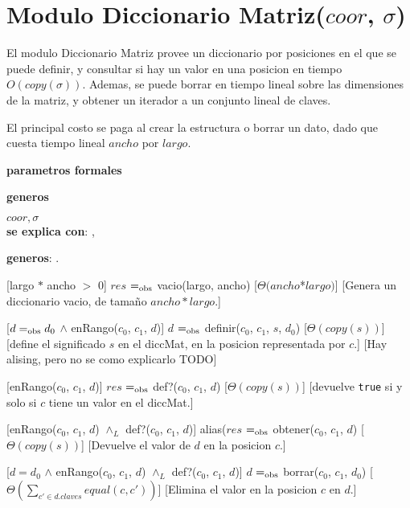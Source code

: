 \section{Modulo Diccionario Matriz($coor$, $\sigma$)}

El modulo Diccionario Matriz provee un diccionario por posiciones en el que se puede definir, y consultar si hay un valor en una posicion en tiempo $O(copy(\sigma))$. Ademas, se puede borrar en tiempo lineal sobre las dimensiones de la matriz, y obtener un iterador a un conjunto lineal de claves.

El principal costo se paga al crear la estructura o borrar un dato, dado que cuesta tiempo lineal $ancho$ por $largo$.

\begin{Interfaz}

  \textbf{parametros formales}\parindent\\
  \parbox{1.7cm}{\textbf{generos}}$coor,\sigma$\\
  \textbf{se explica con}: ,

  \textbf{generos}: .

  [largo $*$ ancho $>$ 0]
  {$res$ $=_{\mathrm{obs}}$ vacio(largo, ancho)}%
  [$\Theta(ancho $*$ largo)$]
  [Genera un diccionario vacio, de tamaño $ancho*largo$.]

  [$d =_{\mathrm{obs}} d_0$ $\land$ enRango($c_0$, $c_1$, $d$)]
  {$d$ $=_{\mathrm{obs}}$ definir($c_0$, $c_1$, $s$, $d_0$)}
  [$\Theta(copy(s))$]
  [define el significado $s$ en el diccMat, en la posicion representada por $c$.]
  [Hay alising, pero no se como explicarlo TODO]

  [enRango($c_0$, $c_1$, $d$)]
  {$res$ $=_{\mathrm{obs}}$ def?($c_0$, $c_1$, $d$)}
  [$\Theta(copy(s))$]
  [devuelve \texttt{true} si y solo si $c$ tiene un valor en el diccMat.]

  [enRango($c_0$, $c_1$, $d$) $\land_L$ def?($c_0$, $c_1$, $d$)] 
  {alias($res$ $=_{\mathrm{obs}}$ obtener($c_0$, $c_1$, $d$)}
  [$\Theta(copy(s))$]
  [Devuelve el valor de $d$ en la posicion $c$.]

  [$d = d_0$ $\land$ enRango($c_0$, $c_1$, $d$) $\land_L$ def?($c_0$, $c_1$, $d$)]
  {$d$ $=_{\mathrm{obs}}$ borrar($c_0$, $c_1$, $d_0$)}
  [$\Theta\left(\displaystyle\sum_{c' \in d.claves}equal(c,c')\right)$]
  [Elimina el valor en la posicion $c$ en $d$.]


\end{Interfaz}
